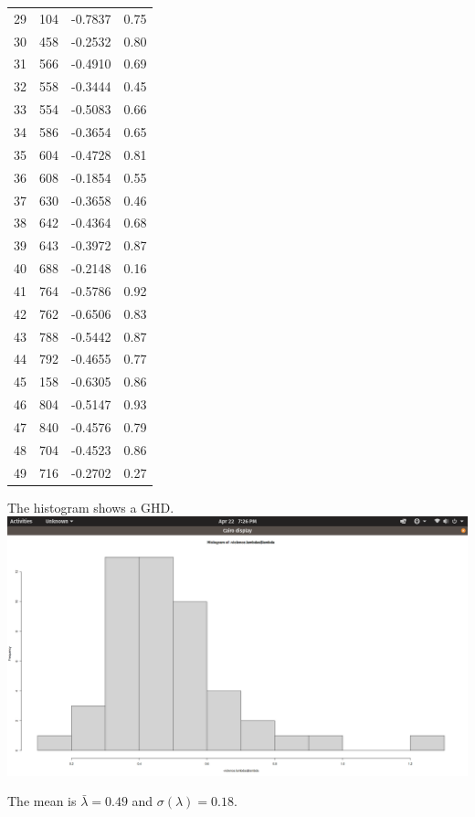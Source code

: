 \documentclass{amsart}
\begin{document}
\begin{longtable}{rrrr}
  29 & 104 & -0.7837 & 0.75 \\ 
  30 & 458 & -0.2532 & 0.80 \\ 
  31 & 566 & -0.4910 & 0.69 \\ 
  32 & 558 & -0.3444 & 0.45 \\ 
  33 & 554 & -0.5083 & 0.66 \\ 
  34 & 586 & -0.3654 & 0.65 \\ 
  35 & 604 & -0.4728 & 0.81 \\ 
  36 & 608 & -0.1854 & 0.55 \\ 
  37 & 630 & -0.3658 & 0.46 \\ 
  38 & 642 & -0.4364 & 0.68 \\ 
  39 & 643 & -0.3972 & 0.87 \\ 
  40 & 688 & -0.2148 & 0.16 \\ 
  41 & 764 & -0.5786 & 0.92 \\ 
  42 & 762 & -0.6506 & 0.83 \\ 
  43 & 788 & -0.5442 & 0.87 \\ 
  44 & 792 & -0.4655 & 0.77 \\ 
  45 & 158 & -0.6305 & 0.86 \\ 
  46 & 804 & -0.5147 & 0.93 \\ 
  47 & 840 & -0.4576 & 0.79 \\ 
  48 & 704 & -0.4523 & 0.86 \\ 
  49 & 716 & -0.2702 & 0.27 \\ 
   \hline
\hline
\end{longtable}

The histogram shows a GHD.
\includegraphics[scale=0.15]{hviol.png}

The mean is $\bar{\lambda}=0.49$ and $\sigma(\lambda) =0.18$.
\end{document}
